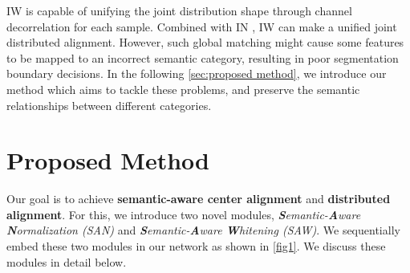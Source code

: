 \documentclass[10pt,twocolumn,letterpaper]{article}
\begin{document}
IW \cite{li2017universal} is capable of unifying the joint distribution shape through channel decorrelation for each sample.
Combined with IN \cite{ulyanov2017improved}, IW can make a unified joint distributed alignment. However, such global matching might cause some features to be mapped to an incorrect semantic category, resulting in poor segmentation boundary decisions. In the following \cref{sec:proposed method}, we introduce our method which aims to tackle these problems, and preserve the semantic relationships between different categories.













\section{Proposed Method \label{sec:proposed method}}

Our goal is to achieve \textbf{semantic-aware center alignment} and \textbf{distributed alignment}. For this, we introduce two novel modules, \textit{\textbf{S}emantic-\textbf{A}ware \textbf{N}ormalization (SAN)} and \textit{\textbf{S}emantic-\textbf{A}ware \textbf{W}hitening (SAW)}. We sequentially embed these two modules in our network as shown in \cref{fig1}. We discuss these modules in detail below.
\end{document}
